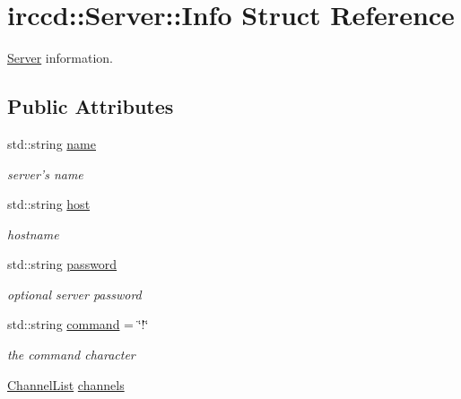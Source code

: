 \hypertarget{a00031}{\section{irccd\-:\-:Server\-:\-:Info Struct Reference}
\label{a00031}
}


\hyperlink{a00055}{Server} information.  


\subsection*{Public Attributes}
\begin{DoxyCompactItemize}
\item 
\hypertarget{a00031_a35c684967ec1079701726fd5697fc056}{std\-::string \hyperlink{a00031_a35c684967ec1079701726fd5697fc056}{name}}\label{a00031_a35c684967ec1079701726fd5697fc056}

\begin{DoxyCompactList}\small\item\em server's name \end{DoxyCompactList}\item 
\hypertarget{a00031_ae2cb24c2f137b318d35c25346741c671}{std\-::string \hyperlink{a00031_ae2cb24c2f137b318d35c25346741c671}{host}}\label{a00031_ae2cb24c2f137b318d35c25346741c671}

\begin{DoxyCompactList}\small\item\em hostname \end{DoxyCompactList}\item 
\hypertarget{a00031_a4b959a9320c6684f0395f2732da9cbc4}{std\-::string \hyperlink{a00031_a4b959a9320c6684f0395f2732da9cbc4}{password}}\label{a00031_a4b959a9320c6684f0395f2732da9cbc4}

\begin{DoxyCompactList}\small\item\em optional server password \end{DoxyCompactList}\item 
\hypertarget{a00031_a829e6a96c09f3c2ad425ec261f08fced}{std\-::string \hyperlink{a00031_a829e6a96c09f3c2ad425ec261f08fced}{command} = \char`\"{}!\char`\"{}}\label{a00031_a829e6a96c09f3c2ad425ec261f08fced}

\begin{DoxyCompactList}\small\item\em the command character \end{DoxyCompactList}\item 
\hypertarget{a00031_ac8429cc90210ec731fcae0fafb304861}{\hyperlink{a00055_aa6c9af0cbeeb89dc0b4ea278ffacaecf}{Channel\-List} \hyperlink{a00031_ac8429cc90210ec731fcae0fafb304861}{channels}}\label{a00031_ac8429cc90210ec731fcae0fafb304861}


\end{DoxyCompactItemize}
